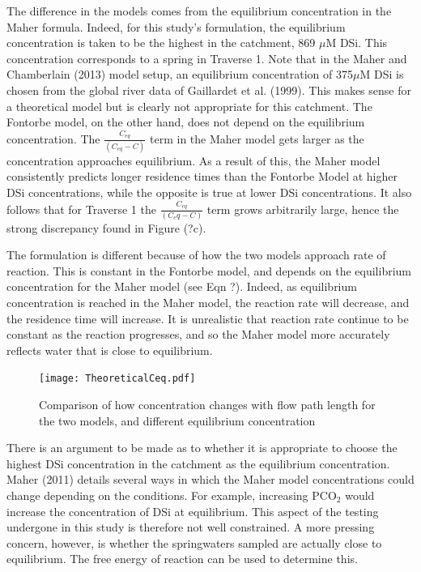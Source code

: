 The difference in the models comes from the equilibrium concentration in the Maher formula. Indeed, for this study's formulation, the equilibrium concentration is taken to be the highest in the catchment, 869 $\mu$M DSi. This concentration corresponds to a spring in Traverse 1. Note that in the Maher and Chamberlain (2013) model setup, an equilibrium concentration of 375$\mu$M DSi is chosen from the global river data of Gaillardet et al. (1999). This makes sense for a theoretical model but is clearly not appropriate for this catchment. The Fontorbe model, on the other hand, does not depend on the equilibrium concentration. The $\frac{C_{eq}}{(C_{eq} - C)}$ term in the Maher model gets larger as the concentration approaches equilibrium. As a result of this, the Maher model consistently predicts longer residence times than the Fontorbe Model at higher DSi concentrations, while the opposite is true at lower DSi concentrations. It also follows that for Traverse 1 the $\frac{C_{eq}}{(C_eq - C)}$ term grows arbitrarily large, hence the strong discrepancy found in Figure (?c).

\bsk

The formulation is different because of how the two models approach rate of reaction. This is constant in the Fontorbe model, and depends on the equilibrium concentration for the Maher model (see Eqn ?). Indeed, as equilibrium concentration is reached in the Maher model, the reaction rate will decrease, and the residence time will increase. It is unrealistic that reaction rate continue to be constant as the reaction progresses, and so the Maher model more accurately reflects water that is close to equilibrium.

\begin{figure}[h]
    \centering
    \texttt{[image: TheoreticalCeq.pdf]}
    \caption{Comparison of how concentration changes with flow path length for the two models, and different equilibrium concentration}
    \label{fig:discussion8}
\end{figure}

\FloatBarrier

There is an argument to be made as to whether it is appropriate to choose the highest DSi concentration in the catchment as the equilibrium concentration. Maher (2011) details several ways in which the Maher model concentrations could change depending on the conditions. For example, increasing PCO$_2$ would increase the concentration of DSi at equilibrium. This aspect of the testing undergone in this study is therefore not well constrained. A more pressing concern, however, is whether the springwaters sampled are actually close to equilibrium. The free energy of reaction can be used to determine this.


